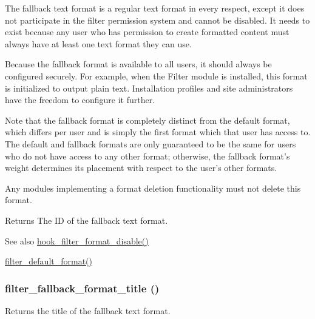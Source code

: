 The fallback text format is a regular text format in every respect, except it does not participate in the filter permission system and cannot be disabled. It needs to exist because any user who has permission to create formatted content must always have at least one text format they can use.

Because the fallback format is available to all users, it should always be configured securely. For example, when the Filter module is installed, this format is initialized to output plain text. Installation profiles and site administrators have the freedom to configure it further.

Note that the fallback format is completely distinct from the default format, which differs per user and is simply the first format which that user has access to. The default and fallback formats are only guaranteed to be the same for users who do not have access to any other format; otherwise, the fallback format's weight determines its placement with respect to the user's other formats.

Any modules implementing a format deletion functionality must not delete this format.

\begin{DoxyReturn}{Returns}
The ID of the fallback text format.
\end{DoxyReturn}
\begin{DoxySeeAlso}{See also}
\hyperlink{group__hooks_gae4873bf6d76c33475296917d304719e9}{hook\_\-filter\_\-format\_\-disable()} 

\hyperlink{filter_8module_a187d29b1feb447737d57276e06655312}{filter\_\-default\_\-format()} 
\end{DoxySeeAlso}
\hypertarget{filter_8module_ad9e4a95f0ee5da1fb64a2c700355c864}{
\subsubsection[{filter\_\-fallback\_\-format\_\-title}]{\setlength{\rightskip}{0pt plus 5cm}filter\_\-fallback\_\-format\_\-title ()}}
\label{filter_8module_ad9e4a95f0ee5da1fb64a2c700355c864}
Returns the title of the fallback text format.

